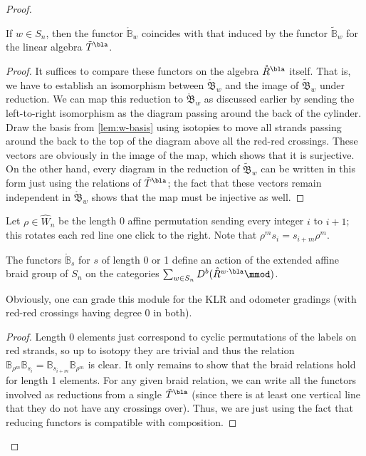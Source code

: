 \begin{proof}
\begin{proposition}\label{prop:ring-reduce}
If $w\in S_n$, then the functor $\mathring{\mathbb{B}}_w$ coincides with that induced by the functor $\tilde{\mathbb{B}}_w$ for the linear algebra $\tilde{T}^\bla$.
\end{proposition}
\begin{proof}
It suffices to compare these functors on the algebra $\mathring{R}^\bla$ itself.  That is, we have to establish an isomorphism between $\mathring{\mathfrak{B}}_w$ and the image of $\tilde {\mathfrak{B}}_w$ under reduction.  We can map this reduction to $\mathring{\mathfrak{B}}_w$ as discussed earlier by sending the left-to-right isomorphism as the diagram passing around the back of the cylinder. Draw the basis from \ref{lem:w-basis} using  isotopies to move all strands passing around the back to the top of the diagram above all the red-red crossings. These vectors are obviously in the image of the map, which shows that it is surjective.  On the other hand, every diagram in the reduction of $\tilde {\mathfrak{B}}_w$ can be written in this form just using the relations of $\tilde{T}^\bla$; the fact that these vectors remain independent in $\mathring{\mathfrak{B}}_w$ shows that the map must be injective as well.
\end{proof}

Let $\rho\in \hat{W}_n$ be the length 0 affine permutation sending every integer $i$ to $i+1$;  this rotates each red line one click to the right.  Note that $\rho^m s_i=s_{i+m}\rho^m$.  
\begin{theorem}\label{thm:B-braid-action}
 The functors $\mathbb{\mathring{B}}_{s}$ for $s$ of length 0 or 1 define an action of the extended affine braid group of $S_n$ on the categories $\sum_{w\in S_n}D^b(\mathring{R}^{w\cdot \bla}\mmod)$.
\end{theorem}
Obviously, one can grade this module for the KLR and odometer gradings (with red-red crossings having degree 0 in both).  
\begin{proof}
Length 0 elements just correspond to cyclic permutations of the labels on red strands, so up to isotopy they are trivial and thus the relation $\mathbb{B}_{\rho^m}  \mathbb{B}_{s_i}=\mathbb{B}_{s_{i+m}} \mathbb{B}_{\rho^m}$ is clear.   It only remains to show that the braid relations hold for length 1 elements.  For any given braid relation, we can write all the functors involved as reductions from a single $\tilde{T}^{\bla}$ (since there is at least one vertical line that they do not have any crossings over).  Thus, we are just using the fact that  reducing functors is compatible with composition.
\end{proof}



\end{proof}
